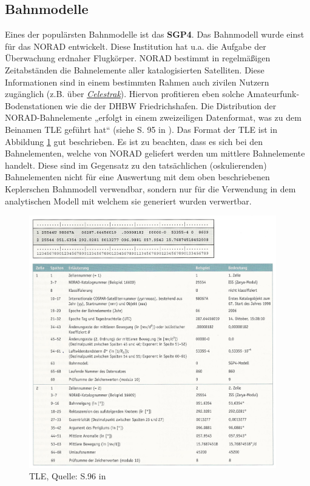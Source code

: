 \subsection{Bahnmodelle}
\label{chap:models}
Eines der populärsten Bahnmodelle ist das \textbf{\ac{SGP4}}. Das Bahnmodell wurde einst für das \ac{NORAD} entwickelt. Diese Institution hat u.a. die Aufgabe der Überwachung erdnaher Flugkörper. \ac{NORAD} bestimmt in regelmäßigen Zeitabständen die Bahnelemente aller katalogisierten Satelliten. Diese Informationen sind in einem bestimmten Rahmen auch zivilen Nutzern zugänglich (z.B. über \href{http://celestrak.com/}{\textit{Celestrak}}). Hiervon profitieren eben solche Amateurfunk-Bodenstationen wie die der DHBW Friedrichshafen. Die Distribution der \ac{NORAD}-Bahnelemente „erfolgt in einem zweizeiligen Datenformat, was zu dem Beinamen \ac{TLE} geführt hat“ (siehe S. 95 in \cite{HandRaum}). Das Format der \ac{TLE} ist in Abbildung \ref{fig:tle} gut beschrieben. Es ist zu beachten, dass es sich bei den Bahnelementen, welche von \ac{NORAD} geliefert werden um mittlere Bahnelemente handelt. Diese sind im Gegensatz zu den tatsächlichen (oskulierenden) Bahnelementen nicht für eine Auswertung mit dem oben beschriebenen Keplerschen Bahnmodell verwendbar, sondern nur für die Verwendung in dem analytischen Modell mit welchem sie generiert wurden verwertbar. 
\begin{figure}[h]                                                                           %
	\centering                                                                            	%
	\includegraphics[width=0.96\textwidth]{./images/tle.jpg}              			            %
	\caption[\ac{TLE}]{\ac{TLE}, Quelle: S.96 in \cite{HandRaum}}                           %
	\label{fig:tle}                                                                         %
\end{figure}                                                                              	%
